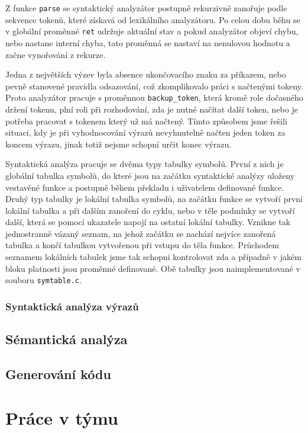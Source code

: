 \documentclass[11pt]{article}
\begin{document}
 Z funkce \texttt{parse} se
 syntaktický analyzátor postupně rekurzivně zanořuje podle sekvence tokenů, které získavá od lexikálního analyzátoru. Po celou
 dobu běhu se v globální proměnné \texttt{ret} udržuje aktuální stav a pokud analyzátor objeví chybu, nebo nastane interní chyba,
 tato proměnná se nastaví na nenulovou hodnotu a začne vynořování z rekurze.

 Jedna z největších výzev byla absence ukončovacího
 znaku za příkazem, nebo pevně stanovené pravidla odsazování, což zkomplikovalo práci s načtenými tokeny. Proto analyzátor pracuje
 s proměnnou \texttt{backup\_token}, která kromě role dočasného držení tokenu, plní roli při rozhodování, zda je nutné načítat
 další token, nebo je potřeba pracovat s tokenem který už má načtený. Tímto způsobem jsme řešili situaci, kdy je při
 vyhodnocování výrazů nevyhnutelně načten jeden token za koncem výrazu, jinak totiž nejsme schopní určit konec výrazu.

 Syntaktická analýza pracuje se dvěma typy tabulky symbolů. První z nich je globální tabulka symbolů, do které jsou na začátku
 syntaktické analýzy uloženy vestavěné funkce a postupně během překladu i uživatelem definované funkce. Druhý typ tabulky je lokální
 tabulka symbolů, na začátku funkce se vytvoří první lokální tabulka a při dalším zanoření do cyklu, nebo v těle podmínky se vytvoří
 další, která se pomocí ukazatele napojí na ostatní lokální tabulky. Vznikne tak jednostranně vázaný seznam, na jehož začátku se nachází
 nejvíce zanořená tabulka a končí tabulkou vytvořenou při vstupu do těla funkce. Průchodem seznamem lokálních tabulek jsme tak
 schopni kontrolovat zda a případně v jakém bloku platnosti jsou proměnné definované. Obě tabulky jsou naimplementované v souboru
 \texttt{symtable.c}.

\subsubsection{Syntaktická analýza výrazů}

\subsection{Sémantická analýza}

\subsection{Generování kódu}

\section{Práce v týmu}
\end{document}
